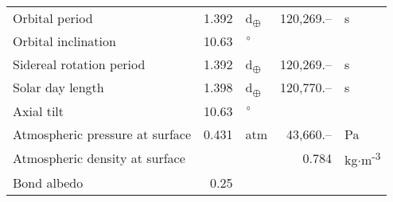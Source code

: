 \begin{tabular}{|p{4cm}|r l|r l|}
  Orbital period & 1.392 & d\textsubscript{$\oplus$} & 120,269.-- & s \\
  Orbital inclination & 10.63 & $\degree$ & & \\
  Sidereal rotation period & 1.392 & d\textsubscript{$\oplus$} & 120,269.-- & s \\
  Solar day length & 1.398 & d\textsubscript{$\oplus$} & 120,770.-- & s \\
  Axial tilt & 10.63 & $\degree$ & & \\
  Atmospheric pressure at surface & 0.431 & atm & 43,660.-- & Pa \\
  Atmospheric density at surface & & & 0.784 & kg$\cdot$m\textsuperscript{-3} \\
  Bond albedo & 0.25 & & & \\
  \hline
\end{tabular}
\newpage
